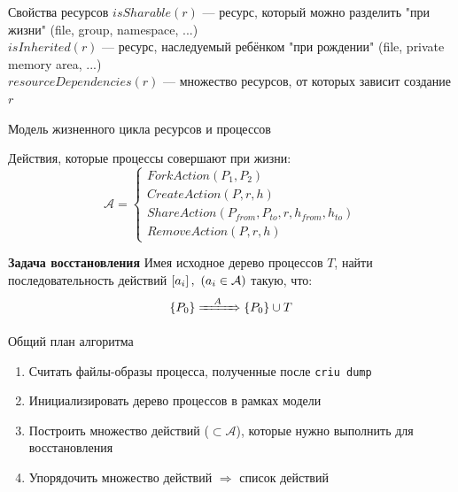 \begin{frame}{Свойства ресурсов}
\alert{$isSharable(r)$} --- ресурс, который можно разделить "при жизни" (file, group, namespace, ...)\\

\alert{$isInherited(r)$} --- ресурс, наследуемый ребёнком "при рождении" (file, private memory area, ...)\\

\alert{$resourceDependencies(r)$} --- множество ресурсов, от которых зависит создание $r$\\

\end{frame}

\begin{frame}{Модель жизненного цикла ресурсов и процессов}

Действия, которые процессы совершают при жизни:
\begin{equation*}
\mathcal{A} = 
\begin{cases}
ForkAction(P_1, P_2)\\
CreateAction(P, r, h)\\
ShareAction(P_{from}, P_{to}, r, h_{from}, h_{to})\\
RemoveAction(P, r, h)
\end{cases}
\end{equation*}


\begin{block}{\textbf{Задача восстановления}}
Имея исходное дерево процессов $T$, найти последовательность действий $\left[ a_i \right],\ (a_i \in \mathcal{A})$ такую, что:
\begin{equation*}
\left\lbrace P_0 \right\rbrace \xRightarrow{\hspace{1em}A\hspace{1em}} \left\lbrace P_0 \right\rbrace \cup T
\end{equation*}
\end{block}
\end{frame}

\begin{frame}{Общий план алгоритма}
\begin{enumerate}
	\item Считать файлы-образы процесса, полученные после \texttt{criu dump}
	\item Инициализировать дерево процессов в рамках модели
	\item Построить множество действий ($\subset \mathcal{A}$), которые нужно выполнить для восстановления
	\item Упорядочить множество действий $\Rightarrow$ список действий
\end{enumerate}
\end{frame}

